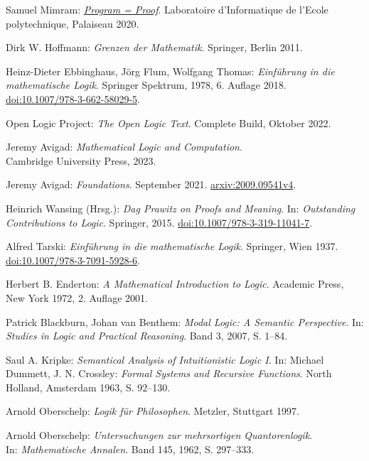 \begin{thebibliography}{00}
Samuel Mimram:
\emph{\href{https://www.lix.polytechnique.fr/Labo/Samuel.Mimram/publications/}%
{Program = Proof}}.
Laboratoire d'Informatique de l'Ecole polytechnique, Palaiseau 2020.

Dirk W. Hoffmann: \emph{Grenzen der Mathematik}.
Springer, Berlin 2011.

Heinz-Dieter Ebbinghaus, Jörg Flum, Wolfgang Thomas:
\emph{Einführung in die mathematische Logik}.
Springer Spektrum, 1978, 6. Auflage 2018.\\
\href{https://doi.org/10.1007/978-3-662-58029-5}%
{doi:10.1007/978-3-662-58029-5}.

 Open Logic Project:
\emph{The Open Logic Text}. Complete Build, Oktober 2022.

 Jeremy Avigad:
\emph{Mathematical Logic and Computation}.\\
Cambridge University Press, 2023.

 Jeremy Avigad: \emph{Foundations}.
September 2021. \href{https://arxiv.org/abs/2009.09541v4}{arxiv:2009.09541v4}.

 Heinrich Wansing (Hrsg.):
\emph{Dag Prawitz on Proofs and Meaning}.
In: \emph{Outstanding Contributions to Logic}. Springer, 2015.
\href{https://doi.org/10.1007/978-3-319-11041-7}{doi:10.1007/978-3-319-11041-7}.

 Alfred Tarski:
\emph{Einführung in die mathematische Logik}. Springer, Wien 1937.\\
\href{https://doi.org/10.1007/978-3-7091-5928-6}{doi:10.1007/978-3-7091-5928-6}.

 Herbert B. Enderton:
\emph{A Mathematical Introduction to Logic}.
Academic Press, New York 1972, 2. Auflage 2001.

 Patrick Blackburn, Johan van Benthem:
\emph{Modal Logic: A Semantic Perspective}.
In: \emph{Studies in Logic and Practical Reasoning}.
Band 3, 2007, S. 1--84.

 Saul A. Kripke:
\emph{Semantical Analysis of Intuitionistic Logic I}.
In: Michael Dummett, J. N. Crossley: \emph{Formal Systems and Recursive
Functions}. North Holland, Amsterdam 1963, S. 92--130.

 Arnold Oberschelp:
\emph{Logik für Philosophen}. Metzler, Stuttgart 1997.

 Arnold Oberschelp:
\emph{Untersuchungen zur mehrsortigen Quantorenlogik}.\\
In: \emph{Mathematische Annalen}. Band 145, 1962, S. 297--333.


\end{thebibliography}
